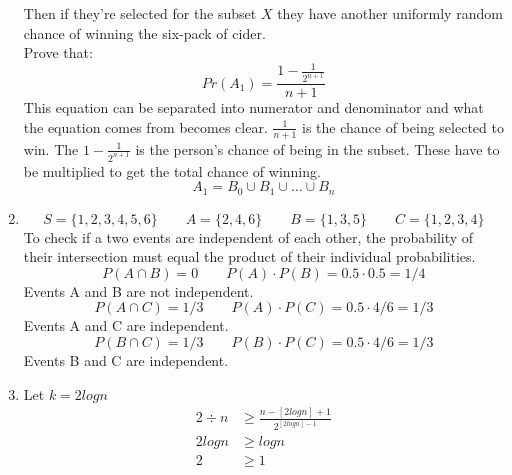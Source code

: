 \documentclass{article}
\begin{document}
\begin{enumerate}
			Then if they're selected for the subset $X$ they have another uniformly random chance of winning the six-pack of cider.
			\\
			Prove that:
			\[Pr(A_1) = \frac{1 - \frac{1}{2^{n+1}}}{n + 1}\]
			This equation can be separated into numerator and denominator and what the equation comes from becomes clear. $\frac{1}{n + 1}$ is the chance of being selected to win. The $1 - \frac{1}{2^{n + 1}}$ is the person's chance of being in the subset. These have to be multiplied to get the total chance of winning.
			\[
			A_1 = B_0 \cup B_1 \cup \ldots \cup B_n
			\]
		\item %
			\[
			S = \{1, 2, 3, 4, 5, 6\}
			\qquad
			A = \{2, 4 , 6\}
			\qquad
			B = \{1, 3, 5\}
			\qquad
			C = \{1, 2, 3, 4\}
			\]
			To check if a two events are independent of each other, the probability of their intersection must equal the product of their individual probabilities.
			\[
				P(A \cap B) = 0
				\qquad
				P(A) \cdot P(B) = 0.5 \cdot 0.5 = 1 / 4
			\]
			Events A and B are not independent.
			\[
				P(A \cap C) = 1 / 3
				\qquad
				P(A) \cdot P(C) = 0.5 \cdot 4 / 6 = 1 / 3 
			\]
			Events A and C are independent.
			\[
				P(B \cap C) = 1 / 3
				\qquad
				P(B) \cdot P(C) = 0.5 \cdot 4 / 6 = 1 / 3
			\]
			Events B and C are independent.
		\item %
			Let $k = 2 log n$
			\begin{align*}
			2 \div n &\ge \frac{n - [2 log n] + 1}{2^{[2 log n] - 1}} \\
			2 log n &\ge log n \\
			2 &\ge 1
			\end{align*}
	\end{enumerate}	
\end{document}
